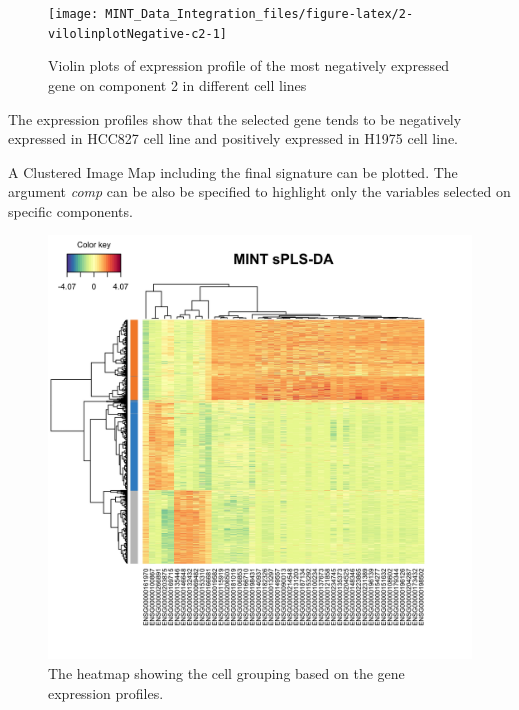 \documentclass[]{book}
\newenvironment{Shaded}{\begin{snugshade}}{\end{snugshade}}
\newcommand{\DataTypeTok}[1]{\textcolor[rgb]{0.13,0.29,0.53}{#1}}
\newcommand{\DecValTok}[1]{\textcolor[rgb]{0.00,0.00,0.81}{#1}}
\newcommand{\KeywordTok}[1]{\textcolor[rgb]{0.13,0.29,0.53}{\textbf{#1}}}
\newcommand{\NormalTok}[1]{#1}
\newcommand{\OperatorTok}[1]{\textcolor[rgb]{0.81,0.36,0.00}{\textbf{#1}}}
\newcommand{\OtherTok}[1]{\textcolor[rgb]{0.56,0.35,0.01}{#1}}
\newcommand{\StringTok}[1]{\textcolor[rgb]{0.31,0.60,0.02}{#1}}
\theoremstyle{definition}
\theoremstyle{definition}
\theoremstyle{definition}
\theoremstyle{remark}
\begin{document}
\begin{figure}[ht]

{\centering \texttt{[image: MINT\_Data\_Integration\_files/figure-latex/2-vilolinplotNegative-c2-1]} 

}

\caption{Violin plots of expression profile of the most negatively expressed gene  on component 2 in different cell lines}\label{fig:2-vilolinplotNegative-c2}
\end{figure}

The expression profiles show that the selected gene tends to be
negatively expressed in HCC827 cell line and positively expressed in
H1975 cell line.

A Clustered Image Map including the final signature can be plotted. The
argument \emph{comp} can be also be specified to highlight only the
variables selected on specific components.

\begin{Shaded}
\end{Shaded}

\begin{figure}[ht]

{\centering \includegraphics[width=0.8\linewidth]{heatmap} 

}

\caption{The heatmap showing the cell grouping based on the gene expression profiles.}\label{fig:2-heatmap}
\end{figure}
\end{document}
